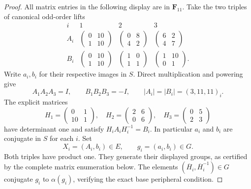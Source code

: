 \begin{proof}
All matrix entries in the following display are in $\mathbf F_{11}$.
Take the two triples of canonical odd-order lifts
\[
\begin{array}{c|ccc}
 i&1&2&3\\\hline
 A_i&
 \begin{pmatrix}0&10\\1&10\end{pmatrix}&
 \begin{pmatrix}0&8\\4&2\end{pmatrix}&
 \begin{pmatrix}6&2\\4&7\end{pmatrix}\\[3pt]
 B_i&
 \begin{pmatrix}0&10\\1&10\end{pmatrix}&
 \begin{pmatrix}1&0\\1&1\end{pmatrix}&
 \begin{pmatrix}1&10\\0&1\end{pmatrix}.
\end{array}
 \tag{D.24.2}
\]
Write $a_i,b_i$ for their respective images in $S$.
Direct multiplication and powering give
\[
 A_1A_2A_3=I,\qquad B_1B_2B_3=-I,
 \qquad |A_i|=|B_i|=(3,11,11)_i.
 \tag{D.24.3}
\]
The explicit matrices
\[
 H_1=\begin{pmatrix}0&1\\10&1\end{pmatrix},\quad
 H_2=\begin{pmatrix}2&6\\0&6\end{pmatrix},\quad
 H_3=\begin{pmatrix}0&5\\2&3\end{pmatrix}
 \tag{D.24.4}
\]
have determinant one and satisfy $H_iA_iH_i^{-1}=B_i$.
In particular $a_i$ and $b_i$ are conjugate in $S$ for each $i$.
Set
\[
 X_i=(A_i,b_i)\in E,\qquad g_i=(a_i,b_i)\in G.
 \tag{D.24.5}
\]
Both triples have product one.  They generate their displayed
groups, as certified by the complete matrix enumeration below.
The elements $(\overline H_i,\overline H_i^{-1})\in G$
conjugate $g_i$ to $\alpha(g_i)$, verifying the exact base
peripheral condition.


\end{proof}
